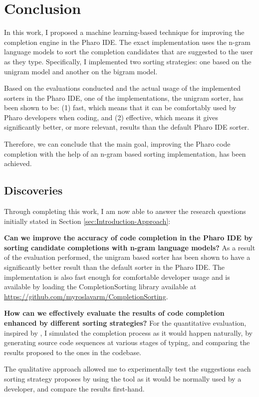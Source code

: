 \chapter{Conclusion}
\label{chap:Conclusion}
In this work, I proposed a machine learning-based technique for improving the completion engine in the Pharo IDE. The exact implementation uses the n-gram language models to sort the completion candidates that are suggested to the user as they type. Specifically, I implemented two sorting strategies: one based on the unigram model and another on the bigram model.

Based on the evaluations conducted and the actual usage of the implemented sorters in the Pharo IDE, one of the implementations, the unigram sorter, has been shown to be: (1) fast, which means that it can be comfortably used by Pharo developers when coding, and (2) effective, which means it gives significantly better, or more relevant, results than the default Pharo IDE sorter.

Therefore, we can conclude that the main goal, improving the Pharo code completion with the help of an n-gram based sorting implementation, has been achieved.

\section{Discoveries}
\label{sec:Conclusion-Discoveries}
Through completing this work, I am now able to answer the research questions initially stated in Section \ref{sec:Introduction-Approach}:
\begin{RQ}
    \item \textbf{Can we improve the accuracy of code completion in the Pharo IDE by sorting candidate completions with n-gram language models?} As a result of the evaluation performed, the unigram based sorter has been shown to have a significantly better result than the default sorter in the Pharo IDE. The implementation is also fast enough for comfortable developer usage and is available by loading the CompletionSorting library available at \url{https://github.com/myroslavarm/CompletionSorting}.
    \item \textbf{How can we effectively evaluate the results of code completion enhanced by different sorting strategies?} For the quantitative evaluation, inspired by \cite{Robb08a}, I simulated the completion process as it would happen naturally, by generating source code sequences at various stages of typing, and comparing the results proposed to the ones in the codebase.
    
    The qualitative approach allowed me to experimentally test the suggestions each sorting strategy proposes by using the tool as it would be normally used by a developer, and compare the results first-hand.
\end{RQ}

